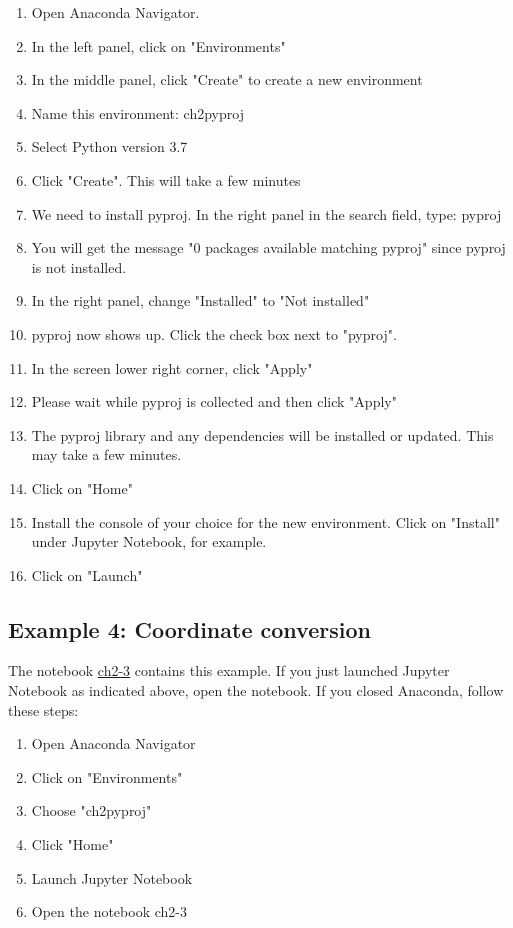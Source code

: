 \documentclass[a4paper , 12pt]{book}
\begin{document}
\begin{enumerate}
    \item Open Anaconda Navigator.
    \item In the left panel, click on "Environments"
    \item In the middle panel, click "Create" to create a new environment
    \item Name this environment: ch2pyproj
    \item Select Python version 3.7
    \item Click "Create". This will take a few minutes
    \item We need to install pyproj. In the right panel in the search field, type: pyproj
    \item You will get the message "0 packages available matching pyproj" since pyproj is not installed. 
    \item In the right panel, change "Installed" to "Not installed"
    \item pyproj now shows up. Click the check box next to "pyproj".
    \item In the screen lower right corner, click "Apply"
    \item Please wait while pyproj is collected and then click "Apply"
    \item The pyproj library and any dependencies will be installed or updated. This may take a few minutes.
    \item Click on "Home"
    \item Install the console of your choice for the new environment. Click on "Install" under Jupyter Notebook, for example.
    \item Click on "Launch"
\end{enumerate}

\subsection*{Example 4: Coordinate conversion}

The notebook \href{https://github.com/nfcd/compGeo/blob/master/source/notebooks/ch2-3.ipynb}{ch2-3} contains this example. If you just launched Jupyter Notebook as indicated above, open the notebook. If you closed Anaconda, follow these steps:

\begin{enumerate}
    \item Open Anaconda Navigator
    \item Click on "Environments"
    \item Choose "ch2pyproj"
    \item Click "Home"
    \item Launch Jupyter Notebook
    \item Open the notebook ch2-3
\end{enumerate}{}
\end{document}
